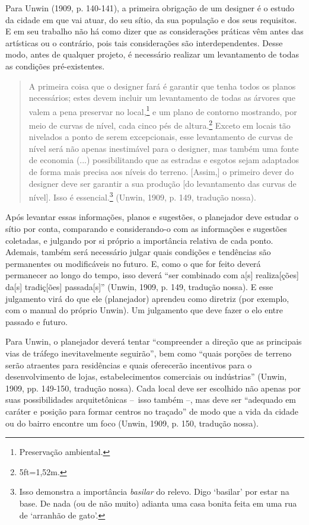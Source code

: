 \documentclass[12pt, a4paper]{book} %
\begin{document}
        Para Unwin (1909, p. 140-141), a primeira obrigação de um designer é o estudo da cidade em que vai atuar, do seu sítio, da sua população e dos seus requisitos. E em seu trabalho não há como dizer que as considerações práticas vêm antes das artísticas ou o contrário, pois tais considerações são interdependentes. Desse modo, antes de qualquer projeto, é necessário realizar um levantamento de todas as condições pré-existentes.

        \begin{quotation}
            A primeira coisa que o designer fará é garantir que tenha todos os planos necessários; estes devem incluir um levantamento de todas as árvores que valem a pena preservar no local,\footnote[4]{Preservação ambiental.} e um plano de contorno mostrando, por meio de curvas de nível, cada cinco pés de altura.\footnote[5]{5ft=1,52m.} Exceto em locais tão nivelados a ponto de serem excepcionais, esse levantamento de curvas de nível será não apenas inestimável para o designer, mas também uma fonte de economia (...) possibilitando que as estradas e esgotos sejam adaptados de forma mais precisa aos níveis do terreno. [Assim,] o primeiro dever do designer deve ser garantir a sua produção [do levantamento das curvas de nível]. Isso é essencial.\footnote[6]{Isso demonstra a importância \textit{basilar} do relevo. Digo `basilar' por estar na base. De nada (ou de não muito) adianta uma casa bonita feita em uma rua de `arranhão de gato'.} (Unwin, 1909, p. 149, tradução nossa).
        \end{quotation}

        Após levantar essas informações, planos e sugestões, o planejador deve estudar o sítio por conta, comparando e considerando-o com as informações e sugestões coletadas, e julgando por si próprio a importância relativa de cada ponto. Ademais, também será necessário julgar quais condições e tendências são permanentes ou modificáveis no futuro. E, como o que for feito deverá permanecer ao longo do tempo, isso deverá ``ser combinado com a[s] realiza[ções] da[s] tradiç[ões] passada[s]'' (Unwin, 1909, p. 149, tradução nossa). E esse julgamento virá do que ele (planejador) aprendeu como diretriz (por exemplo, com o manual do próprio Unwin). Um julgamento que deve fazer o elo entre passado e futuro.

        Para Unwin, o planejador deverá tentar ``compreender a direção que as principais vias de tráfego inevitavelmente seguirão'', bem como ``quais porções de terreno serão atraentes para residências e quais oferecerão incentivos para o desenvolvimento de lojas, estabelecimentos comerciais ou indústrias'' (Unwin, 1909, pp. 149-150, tradução nossa). Cada local deve ser escolhido não apenas por suas possibilidades arquitetônicas – isso também –, mas deve ser ``adequado em caráter e posição para formar centros no traçado'' de modo que a vida da cidade ou do bairro encontre um foco (Unwin, 1909, p. 150, tradução nossa).  
\end{document}
